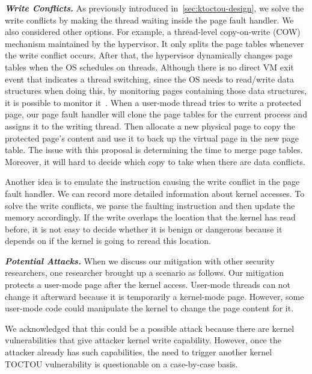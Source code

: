 \textbf{\textit{Write Conflicts.}} As previously introduced in~\autoref{sec:ktoctou-design}, we solve the write conflicts by making the thread waiting inside the page fault handler. We also considered other options. For example, a thread-level copy-on-write (COW) mechanism maintained by the hypervisor. It only splits the page tables whenever the write conflict occurs. After that, the hypervisor dynamically changes page tables when the OS schedules on threads. Although there is no direct VM exit event that indicates a thread switching, since the OS needs to read/write data structures when doing this, by monitoring pages containing those data structures, it is possible to monitor it~\cite{pan2017digtool}. When a user-mode thread tries to write a protected page, our page fault handler will clone the page tables for the current process and assigns it to the writing thread.  Then allocate a new physical page to copy the protected page's content and use it to back up the virtual page in the new page table.  The issue with this proposal is determining the time to merge page tables. Moreover, it will hard to decide which copy to take when there are data conflicts.

Another idea is to emulate the instruction causing the write conflict in the page fault handler. We can record more detailed information about kernel accesses. To solve the write conflicts, we parse the faulting instruction and then update the memory accordingly. If the write overlaps the location that the kernel has read before, it is not easy to decide whether it is benign or dangerous because it depends on if the kernel is going to reread this location.



\textbf{\textit{Potential Attacks.}} When we discuss our mitigation with other security researchers, one researcher brought up a scenario as follows. Our mitigation protects a user-mode page after the kernel access. User-mode threads can not change it afterward because it is temporarily a kernel-mode page. However, some user-mode code could manipulate the kernel to change the page content for it.

We acknowledged that this could be a possible attack because there are kernel vulnerabilities that give attacker kernel write capability. However, once the attacker already has such capabilities, the need to trigger another kernel TOCTOU vulnerability is questionable on a case-by-case basis.
